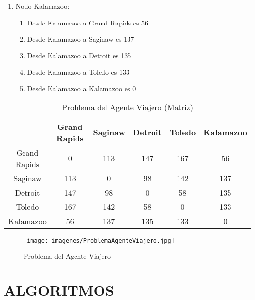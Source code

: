 \documentclass{article}
\begin{document}
\begin{enumerate}
        \item Nodo Kalamazoo:      
            \begin{enumerate}
                \item Desde Kalamazoo a Grand Rapids es 56      
                \item Desde Kalamazoo a Saginaw es 137      
                \item Desde Kalamazoo a Detroit es 135    
                \item Desde Kalamazoo a Toledo es 133      
                \item Desde Kalamazoo a Kalamazoo es 0    
            \end{enumerate}

    \end{enumerate}

\begin{table}[H]
  \centering
  \begin{tabular}{||c c c c c c||} 
    \hline
    \textbf{} & \textbf{Grand Rapids} & \textbf{Saginaw} & \textbf{Detroit} & \textbf{Toledo} & \textbf{Kalamazoo} \\ [0.5ex] 
    \hline\hline
    Grand Rapids    &  0     &  113  &  147  &  167  &  56   \\ [0.5ex]
    Saginaw         &  113   &  0    &  98   &  142  &  137  \\ [0.5ex]
    Detroit         &  147   &  98   &  0    &  58   &  135  \\ [0.5ex]
    Toledo          &  167   &  142  &  58   &  0    &  133  \\ [0.5ex]
    Kalamazoo       &  56    &  137  &  135  &  133  &  0    \\ [0.5ex]
    \hline
  \end{tabular}
  \caption{Problema del Agente Viajero (Matriz)}
  \label{table:AgenteViajeroMatriz}
\end{table} 

\begin{figure}[H]
    \centering
    \texttt{[image: imagenes/ProblemaAgenteViajero.jpg]}
    \caption{\label{fig:problemaAgenteViajero}Problema del Agente Viajero}
\end{figure}


\section{ALGORITMOS}
\end{document}
